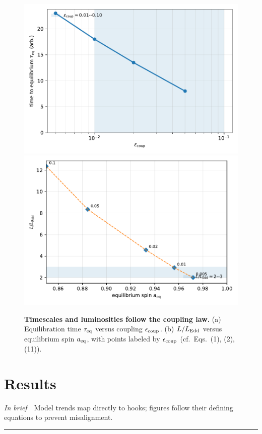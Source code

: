 \documentclass[twocolumn]{aastex701}
\providecommand{\tldr}[1]{%
  \noindent\textit{In brief}\ \textemdash\ #1%
  \par\smallskip
  \noindent\rule{\columnwidth}{0.2pt}\par\medskip
}
\begin{document}
\begin{figure}[!htbp]
  \vspace*{2pt}
  \centering
  \includegraphics[width=.95\linewidth]{Fig4a.pdf}\\[4pt]
  \includegraphics[width=.95\linewidth]{Fig4b.pdf}
  \caption{\textbf{Timescales and luminosities follow the coupling law.}
  (a) Equilibration time $\tau_{\rm eq}$ versus coupling $\epsilon_{\rm coup}$.
  (b) $L/L_{\rm Edd}$ versus equilibrium spin $a_{\rm eq}$, with points labeled by $\epsilon_{\rm coup}$ (cf.\ Eqs.~(1), (2), (11)).}
  \label{fig:fig4}
\end{figure}

\section{Results}\label{sec:results}
\tldr{Model trends map directly to hooks; figures follow their defining equations to prevent misalignment.}
\end{document}
